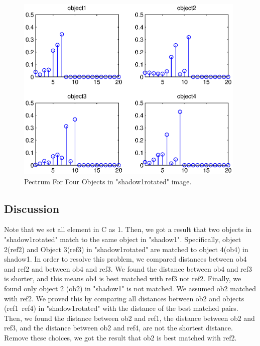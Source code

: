 \documentclass[paper=a4, fontsize=11pt]{scrartcl}
\begin{document}
\begin{figure}
	\centering
	\includegraphics[width=11cm]{pecstrum_for_4objectinshadowrotated1.eps}
	\caption{ Pectrum For Four Objects in "shadow1rotated" image. }
	\label{fig:28}
\end{figure}





\subsection{ Discussion }

Note that we set all element in C as 1. Then, we got a result that two objects in "shadow1rotated" match to the same object in "shadow1". Specifically, object 2(ref2) and Object 3(ref3) in "shadow1rotated" are matched to object 4(ob4) in shadow1. In order to resolve this problem, we compared distances between ob4 and ref2 and between ob4 and ref3.  We found the distance between ob4 and ref3 is shorter,  and this means ob4 is best matched with ref3 not ref2. Finally, we found only object 2 (ob2) in "shadow1"  is not matched. We assumed ob2 matched with ref2. We proved this by comparing all distances between ob2 and objects (ref1~ref4) in "shadow1rotated" with the distance of the best matched pairs. Then, we found the distance between ob2 and ref1, the distance between ob2 and ref3, and the distance between ob2 and ref4, are not the shortest distance. Remove these choices, we got the result that ob2 is best matched with ref2.
\end{document}
